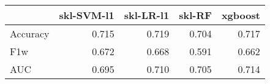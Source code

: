 \begin{tabular}{lrrrr}
\toprule
{} &  skl-SVM-l1 &  skl-LR-l1 &  skl-RF &  xgboost \\
\midrule
Accuracy &       0.715 &      0.719 &   0.704 &    0.717 \\
F1w      &       0.672 &      0.668 &   0.591 &    0.662 \\
AUC      &       0.695 &      0.710 &   0.705 &    0.714 \\
\bottomrule
\end{tabular}
